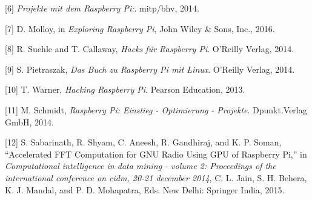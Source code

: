 \documentclass[11pt,ngerman,toc=listof,index=totoc]{scrreprt}
\begin{document}
\hypertarget{ref-2014projekte}{}
{[}6{]} \emph{Projekte mit dem Raspberry Pi:}. mitp/bhv, 2014.

\hypertarget{ref-exploring}{}
{[}7{]} D. Molloy, in \emph{Exploring Raspberry Pi}, John Wiley \& Sons,
Inc., 2016.

\hypertarget{ref-suehle2014hacks}{}
{[}8{]} R. Suehle and T. Callaway, \emph{Hacks für Raspberry Pi}.
O'Reilly Verlag, 2014.

\hypertarget{ref-pietraszak2014buch}{}
{[}9{]} S. Pietraszak, \emph{Das Buch zu Raspberry Pi mit Linux}.
O'Reilly Verlag, 2014.

\hypertarget{ref-warner2013hacking}{}
{[}10{]} T. Warner, \emph{Hacking Raspberry Pi}. Pearson Education,
2013.

\hypertarget{ref-schmidt2014raspberry}{}
{[}11{]} M. Schmidt, \emph{Raspberry Pi: Einstieg - Optimierung -
Projekte}. Dpunkt.Verlag GmbH, 2014.

\hypertarget{ref-Sabarinath2015}{}
{[}12{]} S. Sabarinath, R. Shyam, C. Aneesh, R. Gandhiraj, and K. P.
Soman, ``Accelerated FFT Computation for GNU Radio Using GPU of
Raspberry Pi,'' in \emph{Computational intelligence in data mining -
volume 2: Proceedings of the international conference on cidm, 20-21
december 2014}, C. L. Jain, S. H. Behera, K. J. Mandal, and P. D.
Mohapatra, Eds. New Delhi: Springer India, 2015.
\end{document}
